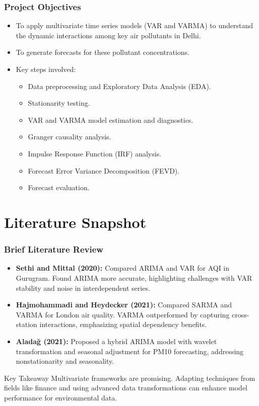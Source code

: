 \documentclass[svgnames, 12pt]{beamer}
\begin{document}
\begin{frame}
    \frametitle{Project Objectives}
    \begin{itemize}
        \item To apply multivariate time series models (VAR and VARMA) to understand the dynamic interactions among key air pollutants in Delhi.
        \item To generate forecasts for these pollutant concentrations.
        \item Key steps involved:
        \begin{itemize}
            \item Data preprocessing and Exploratory Data Analysis (EDA).
            \item Stationarity testing.
            \item VAR and VARMA model estimation and diagnostics.
            \item Granger causality analysis.
            \item Impulse Response Function (IRF) analysis.
            \item Forecast Error Variance Decomposition (FEVD).
            \item Forecast evaluation.
        \end{itemize}
    \end{itemize}
\end{frame}

\section{Literature Snapshot}
\begin{frame}
    \frametitle{Brief Literature Review}
    \begin{itemize}
        \item \textbf{Sethi and Mittal (2020):} Compared ARIMA and VAR for AQI in Gurugram. Found ARIMA more accurate, highlighting challenges with VAR stability and noise in interdependent series.
        \item \textbf{Hajmohammadi and Heydecker (2021):} Compared SARMA and VARMA for London air quality. VARMA outperformed by capturing cross-station interactions, emphasizing spatial dependency benefits.
        \item \textbf{Aladağ (2021):} Proposed a hybrid ARIMA model with wavelet transformation and seasonal adjustment for PM10 forecasting, addressing nonstationarity and seasonality.
    \end{itemize}
    \vspace{0.5cm}
    \begin{alertblock}{Key Takeaway}
        Multivariate frameworks are promising. Adapting techniques from fields like finance and using advanced data transformations can enhance model performance for environmental data.
    \end{alertblock}
\end{frame}
\end{document}

